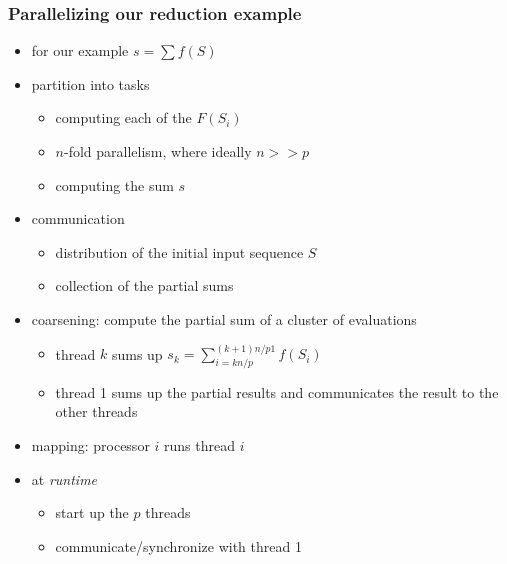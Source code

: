 \begin{frame}[fragile]
%
  \frametitle{Parallelizing our reduction example}
%
  \begin{itemize}
%
    \item for our example $s = \sum f(S)$
    \item partition into tasks
      \begin{itemize}
      \item computing each of the $F(S_{i})$
      \item $n$-fold parallelism, where ideally $n >> p$ 
      \item computing the sum $s$
      \end{itemize}
%
    \item communication
      \begin{itemize}
        \item distribution of the initial input sequence $S$
        \item collection of the partial sums
      \end{itemize}
%
    \item coarsening: compute the partial sum of a cluster of evaluations
      \begin{itemize}
        \item thread $k$ sums up $s_{k} = \sum_{i = k n/p}^{(k+1)n/p 1} f(S_{i})$
        \item thread 1 sums up the partial results and communicates the result to the other
          threads
      \end{itemize}
%
    \item mapping: processor $i$ runs thread $i$
%
    \item at {\em runtime}
      \begin{itemize}
        \item start up the $p$ threads
        \item communicate/synchronize with thread 1
      \end{itemize}
%
  \end{itemize}
%
\end{frame}

